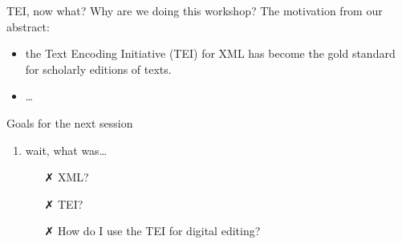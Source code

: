 \begin{frame}{TEI, now what?}
    Why are we doing this workshop? The motivation from our abstract:
    \begin{itemize}
        \item \punkti the Text Encoding Initiative (TEI) for XML has become the gold standard for scholarly editions of texts.
        \item \dots
    \end{itemize}
    
    \begin{block}{Goals for the next session}
    \begin{enumerate}
        \item wait, what was\dots
        \begin{itemize}
            \item[\textcolor{alert}{\faClose}] XML?
            \item[\textcolor{alert}{\faClose}] TEI?
            \item[\textcolor{alert}{\faClose}] How do I use the TEI for digital editing?
        \end{itemize}
    \end{enumerate}

    \end{block}
\end{frame}